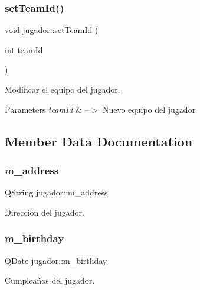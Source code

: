 \subsubsection{\texorpdfstring{set\+Team\+Id()}{setTeamId()}}
{\footnotesize\ttfamily void jugador\+::set\+Team\+Id (\begin{DoxyParamCaption}\item[{int}]{team\+Id }\end{DoxyParamCaption})}



Modificar el equipo del jugador. 


\begin{DoxyParams}{Parameters}
{\em team\+Id} & --$>$ Nuevo equipo del jugador \\
\hline
\end{DoxyParams}


\subsection{Member Data Documentation}
\mbox{\label{classjugador_a1b6be8d5abdbf71ab907ba36c67a524f}} 
\subsubsection{\texorpdfstring{m\+\_\+address}{m\_address}}
{\footnotesize\ttfamily Q\+String jugador\+::m\+\_\+address\hspace{0.3cm}{\ttfamily [private]}}

Dirección del jugador. \mbox{\label{classjugador_aacd583397f387472642e9fd4ac140a82}} 
\subsubsection{\texorpdfstring{m\+\_\+birthday}{m\_birthday}}
{\footnotesize\ttfamily Q\+Date jugador\+::m\+\_\+birthday\hspace{0.3cm}{\ttfamily [private]}}

Cumpleaños del jugador. \mbox{\label{classjugador_a17b4e71f585da8d1e475e51ed4a7dfd4}} 

